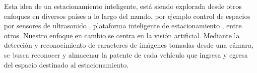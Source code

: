 Esta idea de un estacionamiento inteligente, está siendo explorada desde otros enfoques en diversos países a lo largo del mundo, por ejemplo control de espacios por sensores de ultrasonido \cite{rivera_arroyave_smartparkudea_2021}, plataforma inteligente de estacionamiento \cite{formoso_parkit_2014}, entre otros. Nuestro enfoque en cambio se centra en la visión artificial. Mediante la detección y reconocimiento de caracteres de imágenes tomadas desde una cámara, se busca reconocer y almacenar la patente de cada vehículo que ingresa y egresa del espacio destinado al estacionamiento.

